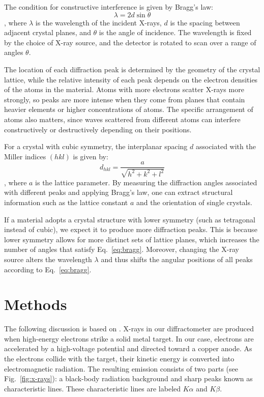 \documentclass{../paper}
\newcommand{\fig}[1]{Fig.~#1}
\newcommand{\eq}[1]{Eq.~#1}
\begin{document}
The condition for constructive interference is given by Bragg's law:
\begin{equation} \label{eq:bragg}
  \lambda = 2 d \sin\theta
\end{equation}
\cite{Cullity}, where $\lambda$ is the wavelength of the incident X-rays, $d$ is the spacing between adjacent crystal planes, and $\theta$ is the angle of incidence. The wavelength is fixed by the choice of X-ray source, and the detector is rotated to scan over a range of angles $\theta$.

The location of each diffraction peak is determined by the geometry of the crystal lattice, while the relative intensity of each peak depends on the electron densities of the atoms in the material. Atoms with more electrons scatter X-rays more strongly, so peaks are more intense when they come from planes that contain heavier elements or higher concentrations of atoms. The specific arrangement of atoms also matters, since waves scattered from different atoms can interfere constructively or destructively depending on their positions.

For a crystal with cubic symmetry, the interplanar spacing $d$ associated with the Miller indices $(hkl)$ is given by:
\begin{equation} \label{eq:d-spacing}
  d_{hkl} = \frac{a}{\sqrt{h^2 + k^2 + l^2}}
\end{equation}
\cite{Cullity}, where $a$ is the lattice parameter. By measuring the diffraction angles associated with different peaks and applying Bragg's law, one can extract structural information such as the lattice constant $a$ and the orientation of single crystals.

If a material adopts a crystal structure with lower symmetry (such as tetragonal instead of cubic), we expect it to produce more diffraction peaks. This is because lower symmetry allows for more distinct sets of lattice planes, which increases the number of angles that satisfy \eq{\ref{eq:bragg}}. Moreover, changing the X-ray source alters the wavelength $\lambda$ and thus shifts the angular positions of all peaks according to \eq{\ref{eq:bragg}}.

\section{Methods}\label{sec:methods}

The following discussion is based on \cite{Laing}. X-rays in our diffractometer are produced when high-energy electrons strike a solid metal target. In our case, electrons are accelerated by a high-voltage potential and directed toward a copper anode. As the electrons collide with the target, their kinetic energy is converted into electromagnetic radiation. The resulting emission consists of two parts (see \fig{\ref{fig:x-rays}}): a black-body radiation background and sharp peaks known as characteristic lines. These characteristic lines are labeled $K\alpha$ and $K\beta$.
\end{document}
